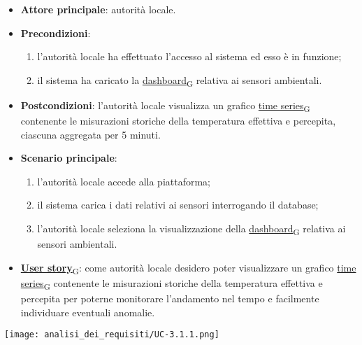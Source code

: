 \newpage
{}
\begin{itemize}
	\item \textbf{Attore principale}: autorità locale.
	\item \textbf{Precondizioni}:
	      \begin{enumerate}
		      \item l'autorità locale ha effettuato l'accesso al sistema ed esso è in funzione;
		      \item il sistema ha caricato la \href{https://7last.github.io/docs/pb/documentazione-interna/glossario\#dashboard}{dashboard\textsubscript{G}} relativa ai sensori ambientali.
	      \end{enumerate}
	\item \textbf{Postcondizioni}: l'autorità locale visualizza un grafico \href{https://7last.github.io/docs/pb/documentazione-interna/glossario\#time-series}{time series\textsubscript{G}} contenente le misurazioni storiche della temperatura effettiva e percepita, ciascuna aggregata per 5 minuti.
	\item \textbf{Scenario principale}:
	      \begin{enumerate}
		      \item l'autorità locale accede alla piattaforma;
		      \item il sistema carica i dati relativi ai sensori interrogando il database;
		      \item l'autorità locale seleziona la visualizzazione della \href{https://7last.github.io/docs/pb/documentazione-interna/glossario\#dashboard}{dashboard\textsubscript{G}} relativa ai sensori ambientali.
	      \end{enumerate}
	\item \href{https://7last.github.io/docs/pb/documentazione-interna/glossario\#user-story}{\textbf{User story}\textsubscript{G}}: come autorità locale desidero poter visualizzare un grafico \href{https://7last.github.io/docs/pb/documentazione-interna/glossario\#time-series}{time series\textsubscript{G}} contenente le misurazioni storiche della temperatura effettiva e percepita per poterne monitorare l'andamento nel tempo e facilmente individuare eventuali anomalie.
\end{itemize}
\begin{center}
	\texttt{[image: analisi\_dei\_requisiti/UC-3.1.1.png]}
\end{center}

